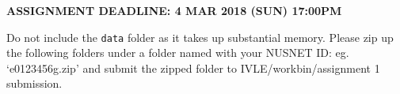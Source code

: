 \documentclass[11pt]{article}
\begin{document}
\textbf{ASSIGNMENT DEADLINE: 4 MAR 2018 (SUN) 17:00PM}

Do not include the \texttt{data} folder as it takes up substantial
memory. Please zip up the following folders under a folder named with
your NUSNET ID: eg. `e0123456g.zip' and submit the zipped folder to
IVLE/workbin/assignment 1 submission.


    
    
    
    
\end{document}
